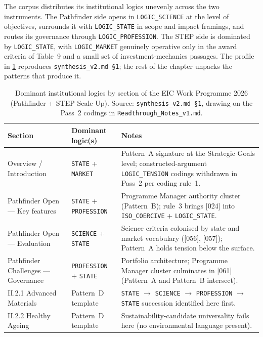 The corpus distributes its institutional logics unevenly across the
two instruments. The Pathfinder side opens in
\texttt{LOGIC\_SCIENCE} at the level of objectives, surrounds it with
\texttt{LOGIC\_STATE} in scope and impact framings, and routes its
governance through \texttt{LOGIC\_PROFESSION}. The STEP side is
dominated by \texttt{LOGIC\_STATE}, with \texttt{LOGIC\_MARKET}
genuinely operative only in the award criteria of Table~9 and a small
set of investment-mechanics passages. The profile in
\cref{tab:res-profile} reproduces \texttt{synthesis\_v2.md~\S1}; the
rest of the chapter unpacks the patterns that produce it.

\begin{table}[H]
\centering
\caption[Logic profile by section]{Dominant institutional logics by
section of the EIC Work Programme 2026 (Pathfinder + STEP Scale Up).
Source: \texttt{synthesis\_v2.md~\S1}, drawing on the Pass~2 codings
in \texttt{Readthrough\_Notes\_v1.md}.}
\label{tab:res-profile}
\begin{tabularx}{\textwidth}{@{}
  >{\raggedright\arraybackslash}p{}
  >{\raggedright\arraybackslash}p{}
  X @{}}
\toprule
\textbf{Section} & \textbf{Dominant logic(s)} & \textbf{Notes} \\
\midrule
Overview / Introduction
  & \texttt{STATE} + \texttt{MARKET}
  & Pattern~A signature at the Strategic Goals level; constructed-argument \texttt{LOGIC\_TENSION} codings withdrawn in Pass~2 per coding rule~1. \\
Pathfinder Open --- Key features
  & \texttt{STATE} + \texttt{PROFESSION}
  & Programme Manager authority cluster (Pattern~B); rule~3 brings [024] into \texttt{ISO\_COERCIVE} + \texttt{LOGIC\_STATE}. \\
Pathfinder Open --- Evaluation
  & \texttt{SCIENCE} + \texttt{STATE}
  & Science criteria colonised by state and market vocabulary ([056], [057]); Pattern~A holds tension below the surface. \\
Pathfinder Challenges --- Governance
  & \texttt{PROFESSION} + \texttt{STATE}
  & Portfolio architecture; Programme Manager cluster culminates in [061] (Pattern~A and Pattern~B intersect). \\
II.2.1 Advanced Materials
  & Pattern~D template
  & \texttt{STATE} $\to$ \texttt{SCIENCE} $\to$ \texttt{PROFESSION} $\to$ \texttt{STATE} succession identified here first. \\
II.2.2 Healthy Ageing
  & Pattern~D template
  & Sustainability-candidate universality fails here (no environmental language present). \\

\end{tabularx}
\end{table}
